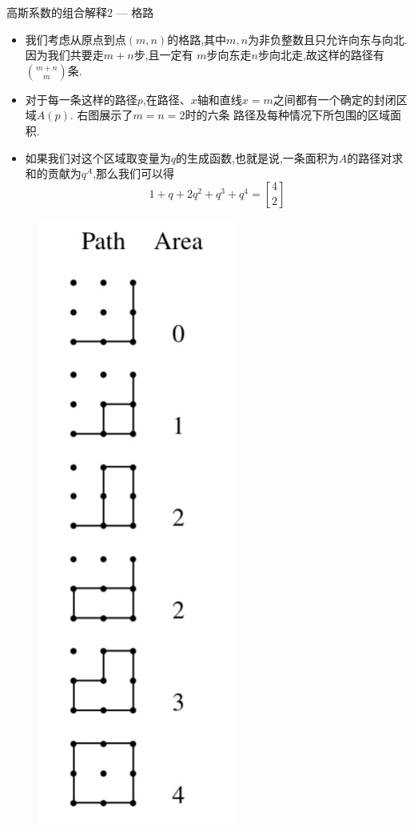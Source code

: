 \documentclass[punct]{ctexbeamer}
\begin{document}
\begin{frame}{高斯系数的组合解释2 --- 格路}
    \begin{minipage}{0.7\linewidth}
        \begin{itemize}
            \item 我们考虑从原点到点$(m,n)$的格路,其中$m,n$为非负整数且只允许向东与向北. 因为我们共要走$m+n$步,且一定有
            $m$步向东走$n$步向北走,故这样的路径有$\binom{m+n}{m}$条.

            \item 对于每一条这样的路径$p$,在路径、$x$轴和直线$x=m$之间都有一个确定的封闭区域$A(p)$. 右图展示了$m=n=2$时的六条
            路径及每种情况下所包围的区域面积.

            \item 如果我们对这个区域取变量为$q$的生成函数,也就是说,一条面积为$A$的路径对求和的贡献为$q^A$,那么我们可以得
            $$
            1+q+2 q^{2}+q^{3}+q^{4}={4\brack 2}
            $$
        \end{itemize}
    \end{minipage}
    \hspace*{20pt}
    \begin{minipage}{0.2\linewidth}
        \begin{figure}
            \centering
            \includegraphics[scale=0.21]{latticepath.PNG}

\end{figure}
\end{minipage}
\end{frame}
\end{document}
